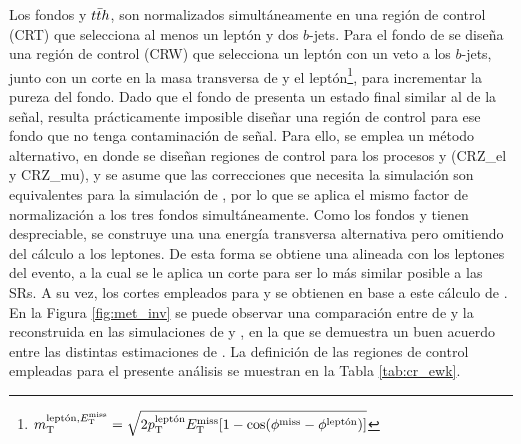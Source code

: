 Los fondos \ttbarph y $t\bar{t} h$, son normalizados simultáneamente en una región de control (CRT) que selecciona al menos un leptón y dos $b$-jets. Para el fondo de \wph se diseña una región de control (CRW) que selecciona un leptón con un veto a los $b$-jets, junto con un corte en la masa transversa de \met y el leptón\footnote{$m_{\text{T}}^{\text{leptón}, E_{\text{T}}^{\text{miss}}} = \sqrt{2p_{\text{T}}^{\text{leptón}}E_{\text{T}}^{\text{miss}}[1-\cos(\phi^{\text{miss}}-\phi^{\text{leptón}})]}$}, para incrementar la pureza del fondo. Dado que el fondo de \znunuph presenta un estado final similar al de la señal, resulta prácticamente imposible diseñar una región de control para ese fondo que no tenga contaminación de señal. Para ello, se emplea un método alternativo, en donde se diseñan regiones de control para los procesos \zeeph y \zmumuph (CRZ\_el y CRZ\_mu), y se asume que las correcciones que necesita la simulación son equivalentes para la simulación de \znunuph, por lo que se aplica el mismo factor de normalización a los tres fondos simultáneamente. Como los fondos \zeeph y \zmumuph tienen \met despreciable, se construye una una energía transversa alternativa pero omitiendo del cálculo a los leptones. De esta forma se obtiene una \met alineada con los leptones del evento, a la cual se le aplica un corte para ser lo más similar posible a las SRs. A su vez, los cortes empleados para \dphijetmet y \dphigammet se obtienen en base a este cálculo de \met. 
\linebreak
En la Figura \ref{fig:met_inv} se puede observar una comparación entre \met de \znunuph y la reconstruida en las simulaciones de \zeeph y \zmumuph, en la que se demuestra un buen acuerdo entre las distintas estimaciones de \met. La definición de las regiones de control empleadas para el presente análisis se muestran en la Tabla \ref{tab:cr_ewk}.

